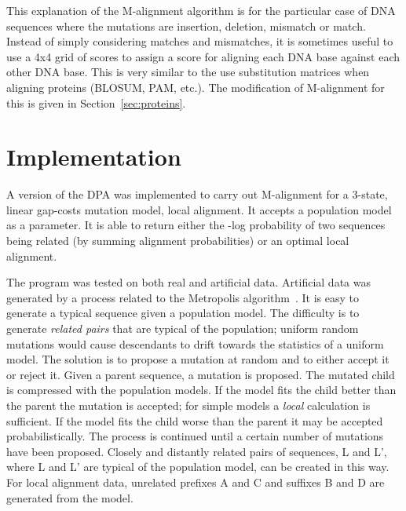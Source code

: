\documentclass[letterpaper,11pt,oneside]{article}
\begin{document}
\begin{multicols}{2}
This explanation of the M-alignment algorithm is for the particular case of
DNA sequences where the mutations are insertion, deletion, mismatch or match.
Instead of simply considering matches and mismatches, it is sometimes useful
to use a 4x4 grid of scores to assign a score for aligning each DNA base
against each other DNA base.  This is very similar to the use substitution
matrices when aligning proteins (BLOSUM, PAM, etc.).  The modification of
M-alignment for this is given in Section~\ref{sec:proteins}.

\section{Implementation} \label{sec:impl}

A version of the DPA was implemented to carry out M-alignment for
a 3-state, linear gap-costs mutation model, local alignment.
It accepts a population model as a parameter.
It is able to return either
the -log probability of two sequences being related
(by summing alignment probabilities) or
an optimal local alignment.

The program was tested on both real and artificial data.
Artificial data was generated by a process related to the
Metropolis algorithm~\cite{metropolis53}.
It is easy to generate a typical sequence given a population model.
The difficulty is to generate {\em related pairs} that are typical
of the population; uniform random mutations would cause
descendants to drift towards the statistics of a uniform model.
The solution is to propose a mutation at random and to either accept it
or reject it.
Given a parent sequence, a mutation is proposed.
The mutated child is compressed with the population models.
If the model fits the child better than the parent the mutation is accepted;
for simple models a {\em local} calculation is sufficient.
If the model fits the child worse than the parent it may be accepted
probabilistically.
The process is continued until a certain number of mutations have been proposed.
Closely and distantly related pairs of sequences, L and L',
where L and L' are typical of the population model, can be created in this way.
For local alignment data,
unrelated prefixes A and C and suffixes B and D are generated from the model.




\end{multicols}
\end{document}
